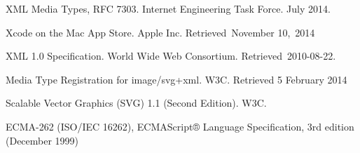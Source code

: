 \begin{thebibliography}{9}
XML Media Types, RFC 7303. Internet Engineering Task Force. July 2014.
 
Xcode on the Mac App Store. Apple Inc. Retrieved November 10, 2014
 
XML 1.0 Specification. World Wide Web Consortium. Retrieved 2010-08-22.

Media Type Registration for image/svg+xml. W3C. Retrieved 5 February 2014 

Scalable Vector Graphics (SVG) 1.1 (Second Edition). W3C.

ECMA-262 (ISO/IEC 16262), ECMAScript® Language Specification, 3rd edition (December 1999)

\end{thebibliography}


